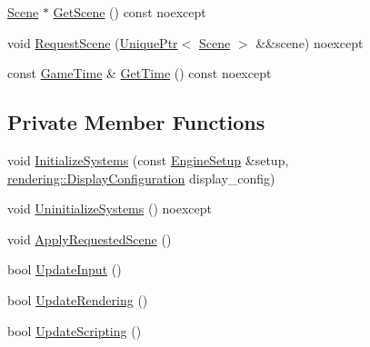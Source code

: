 \begin{DoxyCompactItemize}
\item 
\hyperlink{classmage_1_1_scene}{Scene} $\ast$ \hyperlink{classmage_1_1_engine_ac76b2061f2b5b9089a6b2387a40dbf73}{Get\+Scene} () const noexcept
\item 
void \hyperlink{classmage_1_1_engine_a0999f6eb6b09ad015103a46509b333b8}{Request\+Scene} (\hyperlink{namespacemage_a3316d7143a973e37adf1110f2e80ca31}{Unique\+Ptr}$<$ \hyperlink{classmage_1_1_scene}{Scene} $>$ \&\&scene) noexcept
\item 
const \hyperlink{classmage_1_1_game_time}{Game\+Time} \& \hyperlink{classmage_1_1_engine_a77d6f8ed151e50360da8f6afcce463ea}{Get\+Time} () const noexcept
\end{DoxyCompactItemize}
\subsection*{Private Member Functions}
\begin{DoxyCompactItemize}
\item 
void \hyperlink{classmage_1_1_engine_aec74e74ebec5c7739740bbeb825526ad}{Initialize\+Systems} (const \hyperlink{classmage_1_1_engine_setup}{Engine\+Setup} \&setup, \hyperlink{classmage_1_1rendering_1_1_display_configuration}{rendering\+::\+Display\+Configuration} display\+\_\+config)
\item 
void \hyperlink{classmage_1_1_engine_ac0632bce91156f13d4bc76f5b25fc94b}{Uninitialize\+Systems} () noexcept
\item 
void \hyperlink{classmage_1_1_engine_a4fcb9760814dfa59c9fff34f1c82357b}{Apply\+Requested\+Scene} ()
\item 
bool \hyperlink{classmage_1_1_engine_ad35eef077bc695803769a385e2751cbe}{Update\+Input} ()
\item 
bool \hyperlink{classmage_1_1_engine_a5a39d76019d51290a5ba305c57384fae}{Update\+Rendering} ()
\item 
bool \hyperlink{classmage_1_1_engine_a3c7a55a89a23952a368432f933a90d26}{Update\+Scripting} ()
\end{DoxyCompactItemize}
